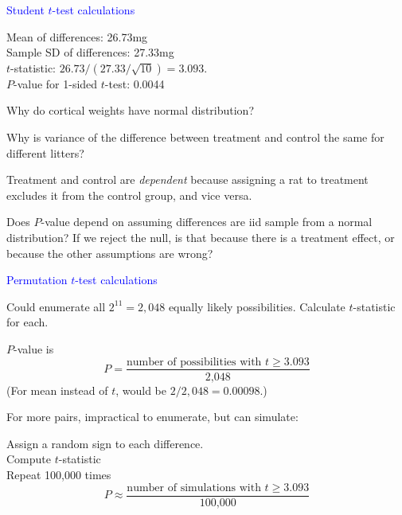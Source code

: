 \documentclass[landscape]{slides}
\begin{document}
\begin {slide}
{\textcolor{blue}{\sc Student $t$-test calculations}}

Mean of differences:  26.73mg \\
Sample SD of differences:  27.33mg \\
$t$-statistic: $26.73/(27.33/\sqrt{10}) = 3.093$.\\[1ex]
$P$-value for 1-sided $t$-test:  0.0044

{\textcolor{one}{Why do cortical weights have normal distribution?}}

{\textcolor{one}{Why is variance of the difference between treatment and control
the same for different litters?}}

{\textcolor{one}{Treatment and control are {\em dependent\/} because assigning
a rat to treatment excludes it from the control group, and vice versa.}}

{\textcolor{one}{Does $P$-value depend on assuming differences 
are iid sample from a normal distribution?  If we reject the null, is that because
there is a treatment effect, or because the other assumptions are wrong?}}

\end {slide}

\begin {slide}
{\textcolor{blue}{\sc Permutation $t$-test calculations}}

Could enumerate all $2^{11} = 2,048$ equally likely possibilities.
Calculate $t$-statistic for each.

$P$-value is 
$$
	P = \frac{\mbox{number of possibilities with $t \ge 3.093$}}{\mbox{2,048}}
$$
(For mean instead of $t$, would be $2/2,048 =  0.00098$.)

For more pairs, impractical to enumerate, but can simulate:

Assign a random sign to each difference. \\
Compute $t$-statistic \\
Repeat 100,000 times
$$
	P \approx \frac{\mbox{number of simulations with $t \ge 3.093$}}{\mbox{100,000}}
$$

\end {slide}
\end{document}
